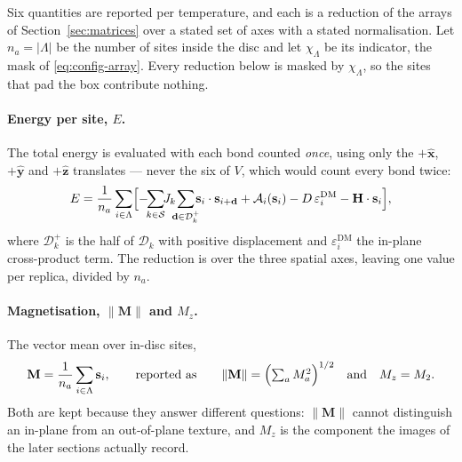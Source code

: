 \documentclass[11pt,a4paper]{article}
\newcommand{\vs}{\mathbf{s}}
\newcommand{\vd}{\mathbf{d}}
\newcommand{\vM}{\mathbf{M}}
\newcommand{\vH}{\mathbf{H}}
\newcommand{\shells}{\mathcal{S}}
\begin{document}
Six quantities are reported per temperature, and each is a reduction of the
arrays of Section~\ref{sec:matrices} over a stated set of axes with a stated
normalisation. Let $n_a = |\Lambda|$ be the number of sites inside the disc and
let $\chi_\Lambda$ be its indicator, the mask of \eqref{eq:config-array}. Every
reduction below is masked by $\chi_\Lambda$, so the sites that pad the box
contribute nothing.

\paragraph{Energy per site, $E$.} The total energy is evaluated with each bond
counted \emph{once}, using only the $+\hat{\mathbf{x}}$, $+\hat{\mathbf{y}}$ and
$+\hat{\mathbf{z}}$ translates --- never the six of $V$, which would count every
bond twice:
%
\begin{equation}
E = \frac{1}{n_a} \sum_{i \in \Lambda} \Bigl[
  -\!\!\sum_{k \in \shells}\!\! J_k \!\!\!\sum_{\vd \in \mathcal{D}_k^{+}}\!\!\!
     \vs_i \cdot \vs_{i+\vd}
  + \mathcal{A}_i(\vs_i)
  - D\, \varepsilon^{\mathrm{DM}}_i
  - \vH \cdot \vs_i \Bigr],
\label{eq:obs-E}
\end{equation}
%
where $\mathcal{D}_k^{+}$ is the half of $\mathcal{D}_k$ with positive
displacement and $\varepsilon^{\mathrm{DM}}_i$ the in-plane cross-product term.
The reduction is over the three spatial axes, leaving one value per replica,
divided by $n_a$.

\paragraph{Magnetisation, $\lVert\vM\rVert$ and $M_z$.} The vector mean over
in-disc sites,
%
\begin{equation}
\vM = \frac{1}{n_a} \sum_{i \in \Lambda} \vs_i ,
\qquad\text{reported as}\qquad
\lVert \vM \rVert = \Bigl(\textstyle\sum_a M_a^2\Bigr)^{1/2}
\quad\text{and}\quad M_z = M_2 .
\label{eq:obs-M}
\end{equation}
%
Both are kept because they answer different questions: $\lVert\vM\rVert$ cannot
distinguish an in-plane from an out-of-plane texture, and $M_z$ is the component
the images of the later sections actually record.
\end{document}
